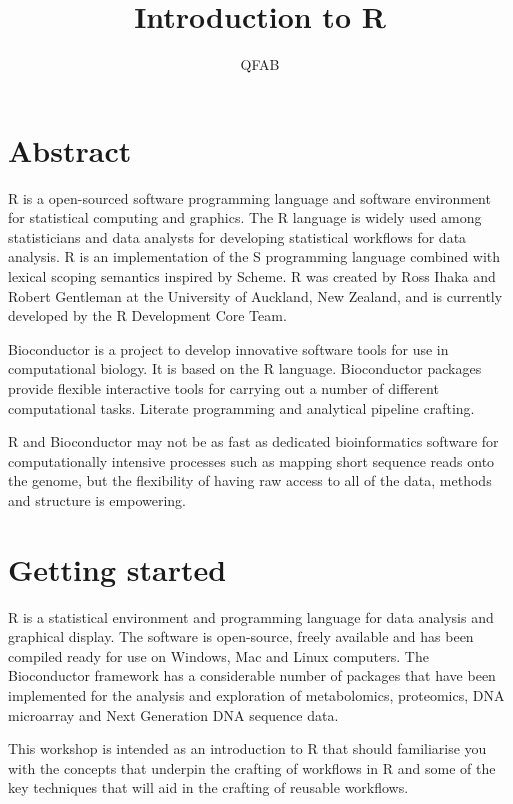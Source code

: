 \documentclass[a4paper]{book}
\title{Introduction to R}
\author{QFAB}
\date{}
\begin{document}
\maketitle

{
\setcounter{tocdepth}{1}
\tableofcontents
}
\chapter*{Abstract}\label{abstract}

R is a open-sourced software programming language and software
environment for statistical computing and graphics. The R language is
widely used among statisticians and data analysts for developing
statistical workflows for data analysis. R is an implementation of the S
programming language combined with lexical scoping semantics inspired by
Scheme. R was created by Ross Ihaka and Robert Gentleman at the
University of Auckland, New Zealand, and is currently developed by the R
Development Core Team.

Bioconductor is a project to develop innovative software tools for use
in computational biology. It is based on the R language. Bioconductor
packages provide flexible interactive tools for carrying out a number of
different computational tasks. Literate programming and analytical
pipeline crafting.

R and Bioconductor may not be as fast as dedicated bioinformatics
software for computationally intensive processes such as mapping short
sequence reads onto the genome, but the flexibility of having raw access
to all of the data, methods and structure is empowering.

\chapter{Getting started}\label{getting-started}

R is a statistical environment and programming language for data
analysis and graphical display. The software is open-source, freely
available and has been compiled ready for use on Windows, Mac and Linux
computers. The Bioconductor framework has a considerable number of
packages that have been implemented for the analysis and exploration of
metabolomics, proteomics, DNA microarray and Next Generation DNA
sequence data.

This workshop is intended as an introduction to R that should
familiarise you with the concepts that underpin the crafting of
workflows in R and some of the key techniques that will aid in the
crafting of reusable workflows.
\end{document}
